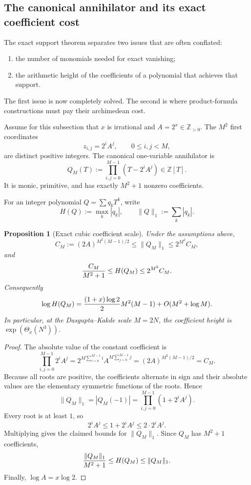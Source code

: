 \documentclass[11pt,oneside]{article}
\newtheorem{proposition}[theorem]{Proposition}
\theoremstyle{definition}
\theoremstyle{remark}
\newcommand{\Z}{\mathbb Z}
\begin{document}
\subsection{The canonical annihilator and its exact coefficient cost}
\label{sec:sparse-height}

The exact support theorem separates two issues that are often conflated:
\begin{enumerate}
\item the number of monomials needed for exact vanishing;
\item the arithmetic height of the coefficients of a polynomial that achieves that support.
\end{enumerate}
The first issue is now completely solved.  The second is where product-formula constructions
must pay their archimedean cost.

Assume for this subsection that $x$ is irrational and $A=2^x\in\Z_{>0}$.  The $M^2$ first
coordinates
\[
  z_{i,j}=2^iA^j,
  \qquad 0\le i,j<M,
\]
are distinct positive integers.  The canonical one-variable annihilator is
\[
  Q_M(T):=\prod_{i,j=0}^{M-1}(T-2^iA^j)\in\Z[T].
\]
It is monic, primitive, and has exactly $M^2+1$ nonzero coefficients.

For an integer polynomial $Q=\sum q_kT^k$, write
\[
  H(Q):=\max_k|q_k|,
  \qquad
  \|Q\|_1:=\sum_k|q_k|.
\]

\begin{proposition}[Exact cubic coefficient scale]
\label{prop:canonical-height}
Under the assumptions above,
\[
  C_M:=(2A)^{M^2(M-1)/2}
  \le \|Q_M\|_1
  \le 2^{M^2}C_M,
\]
and
\[
  {C_M\over M^2+1}\le H(Q_M)\le2^{M^2}C_M.
\]
Consequently
\[
  \log H(Q_M)
  ={(1+x)\log2\over2}M^2(M-1)+O(M^2+\log M).
\]
In particular, at the Dasgupta--Kakde scale $M=2N$, the coefficient height is
$\exp(\Theta_x(N^3))$.
\end{proposition}

\begin{proof}
The absolute value of the constant coefficient is
\[
  \prod_{i,j=0}^{M-1}2^iA^j
  =2^{M\sum_{i=0}^{M-1}i}A^{M\sum_{j=0}^{M-1}j}
  =(2A)^{M^2(M-1)/2}=C_M.
\]
Because all roots are positive, the coefficients alternate in sign and their absolute values
are the elementary symmetric functions of the roots.  Hence
\[
  \|Q_M\|_1=|Q_M(-1)|
  =\prod_{i,j=0}^{M-1}(1+2^iA^j).
\]
Every root is at least $1$, so
\[
  2^iA^j\le1+2^iA^j\le2\cdot2^iA^j.
\]
Multiplying gives the claimed bounds for $\|Q_M\|_1$.  Since $Q_M$ has $M^2+1$
coefficients,
\[
  {\|Q_M\|_1\over M^2+1}\le H(Q_M)\le\|Q_M\|_1.
\]
Finally, $\log A=x\log2$.
\end{proof}
\end{document}

